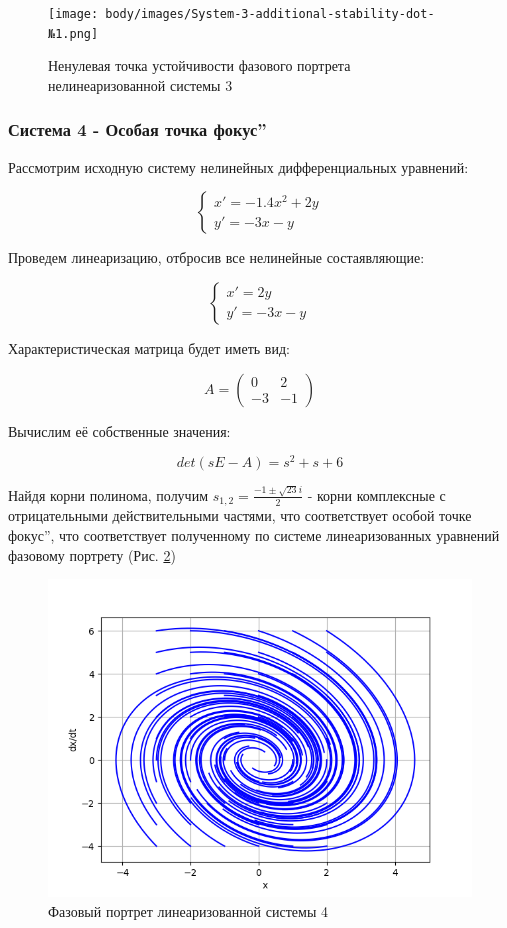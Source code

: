 \begin{figure}[H]
	\centering
	\texttt{[image: body/images/System-3-additional-stability-dot-№1.png]}
	\caption{Ненулевая точка устойчивости фазового портрета нелинеаризованной системы 3}
	\label{fig:8}
\end{figure}

\subsubsection{Система 4 - Особая точка  фокус\textquotedblright}

Рассмотрим исходную систему нелинейных дифференциальных уравнений:

$$
\begin{cases}
x' = - 1.4x^2 + 2y\\
y' = -3x - y
\end{cases}
$$

Проведем линеаризацию, отбросив все нелинейные состаявляющие:

$$
\begin{cases}
	x' = 2y\\
	y' = -3x - y
\end{cases}
$$

Характеристическая матрица будет иметь вид:

$$
A = 
\begin{pmatrix}
	0 & 2 \\
	-3 & -1
\end{pmatrix}
$$

Вычислим её собственные значения:

$$
det(sE - A) = s^2 + s + 6
$$

Найдя корни полинома, получим $s_{1,2} = \frac{-1\pm\sqrt{23}i}{2}$ - корни комплексные с отрицательными действительными частями, 
что соответствует особой точке  фокус\textquotedblright, 
что соответствует полученному по системе линеаризованных уравнений фазовому портрету (Рис. \ref{fig:9})

\begin{figure}[H]
	\centering
	\includegraphics[width=0.6\linewidth]{body/images/Linearized-system-4.png}
	\caption{Фазовый портрет линеаризованной системы 4}
	\label{fig:9}
\end{figure}

